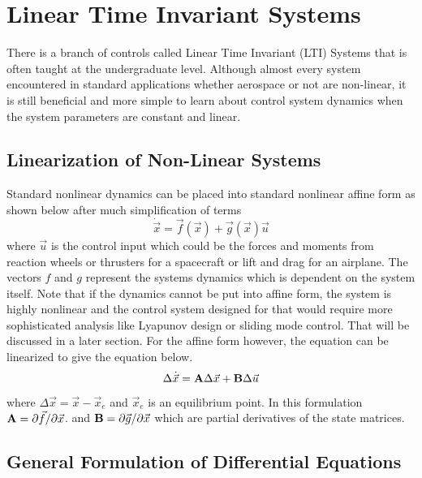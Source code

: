 \section{Linear Time Invariant Systems}

There is a branch of controls called Linear Time Invariant (LTI)
Systems that is often taught at the undergraduate level. Although
almost every system encountered in standard applications whether
aerospace or not are non-linear, it is still beneficial and more
simple to learn about control system dynamics when the system
parameters are constant and linear. 

\subsection{Linearization of Non-Linear Systems}

Standard nonlinear dynamics can be placed into standard
nonlinear affine form as shown below after much simplification of
terms
\begin{equation}
  \dot{\vec{x}} = \vec{f}(\vec{x}) + \vec{g}(\vec{x})\vec{u}
\end{equation}
where $\vec{u}$ is the control input which could be the forces and
moments from reaction wheels or thrusters for a spacecraft or lift and drag for an airplane. The vectors $f$ and $g$ represent the systems dynamics which is dependent on the system itself. Note that if the dynamics cannot be put into affine form, the system is highly nonlinear and the control system designed for that would require more sophisticated analysis like Lyapunov design or sliding mode control. That will be discussed in a later section. For the affine form however, the equation can be
linearized to give the equation below. 
\begin{equation}
  \Delta \dot{\vec{x}} = {\bf A}\Delta {\vec{x}} + {\bf B}\Delta \vec{u}
\end{equation}
where $\Delta \vec{x} = \vec{x} - \vec{x}_e$ and $\vec{x}_e$ is an
equilibrium point. In this formulation ${\bf A} = \partial \vec{f}/\partial \vec{x}$. and 
${\bf B} = \partial \vec{g}/\partial \vec{x}$ which are partial derivatives of the state matrices.

\subsection{General Formulation of Differential Equations}

